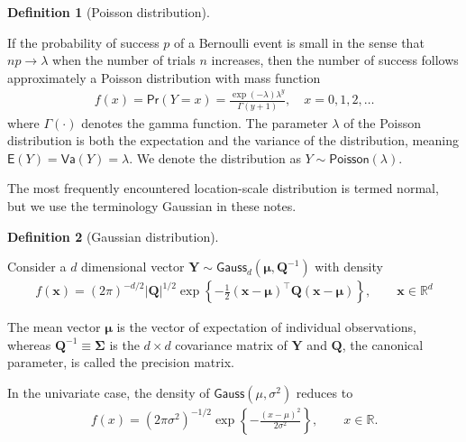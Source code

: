 \documentclass[
  11pt,
  letterpaper,
]{scrbook}
\theoremstyle{definition}
\theoremstyle{plain}
\theoremstyle{plain}
\theoremstyle{definition}
\theoremstyle{definition}
\newtheorem{definition}{Definition}[chapter]
\theoremstyle{remark}
\begin{document}
\begin{definition}[Poisson
distribution]\protect\hypertarget{def-poissondist}{}\label{def-poissondist}

If the probability of success \(p\) of a Bernoulli event is small in the
sense that \(np \to \lambda\) when the number of trials \(n\) increases,
then the number of success follows approximately a Poisson distribution
with mass function \begin{align*}
f(x)=\mathsf{Pr}(Y=x) = \frac{\exp(-\lambda)\lambda^y}{\Gamma(y+1)}, \quad x=0, 1, 2, \ldots
\end{align*} where \(\Gamma(\cdot)\) denotes the gamma function. The
parameter \(\lambda\) of the Poisson distribution is both the
expectation and the variance of the distribution, meaning
\(\mathsf{E}(Y)=\mathsf{Va}(Y)=\lambda.\) We denote the distribution as
\(Y \sim \mathsf{Poisson}(\lambda)\).

\end{definition}

The most frequently encountered location-scale distribution is termed
normal, but we use the terminology Gaussian in these notes.

\begin{definition}[Gaussian
distribution]\protect\hypertarget{def-gaussian}{}\label{def-gaussian}

Consider a \(d\) dimensional vector
\(\boldsymbol{Y} \sim \mathsf{Gauss}_d(\boldsymbol{\mu}, \boldsymbol{Q}^{-1})\)
with density \begin{align*}
f(\boldsymbol{x}) = (2\pi)^{-d/2} |\boldsymbol{Q}|^{1/2} \exp \left\{ - \frac{1}{2} (\boldsymbol{x}-\boldsymbol{\mu})^\top \boldsymbol{Q}(\boldsymbol{x}-\boldsymbol{\mu})\right\}, \qquad \boldsymbol{x} \in \mathbb{R}^d
\end{align*}

The mean vector \(\boldsymbol{\mu}\) is the vector of expectation of
individual observations, whereas
\(\boldsymbol{Q}^{-1}\equiv \boldsymbol{\Sigma}\) is the \(d \times d\)
covariance matrix of \(\boldsymbol{Y}\) and \(\boldsymbol{Q}\), the
canonical parameter, is called the precision matrix.

In the univariate case, the density of \(\mathsf{Gauss}(\mu, \sigma^2)\)
reduces to \begin{align*}
f(x) = (2\pi\sigma^2)^{-1/2} \exp \left\{ - \frac{(x-\mu)^2}{2\sigma^2}\right\}, \qquad x \in \mathbb{R}.
\end{align*}

\end{definition}
\end{document}
